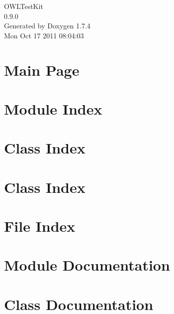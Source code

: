 \documentclass[a4paper]{book}
\begin{document}
\begin{titlepage}
\vspace*{7cm}
\begin{center}
{\Large OWLTestKit \\[1ex]\large 0.9.0 }\\
\vspace*{1cm}
{\large Generated by Doxygen 1.7.4}\\
\vspace*{0.5cm}
{\small Mon Oct 17 2011 08:04:03}\\
\end{center}
\end{titlepage}
\clearemptydoublepage
{}
\tableofcontents
\clearemptydoublepage
{}
\chapter{Main Page}
\label{index}
\chapter{Module Index}

\chapter{Class Index}

\chapter{Class Index}

\chapter{File Index}

\chapter{Module Documentation}








\chapter{Class Documentation}




















\end{document}
